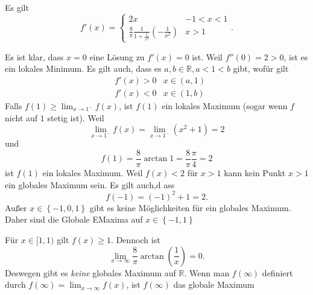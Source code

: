 \documentclass[prb,12pt]{revtex4-2}
\theoremstyle{definition}
\theoremstyle{definition}
\newcommand{\R}{\mathbb{R}}
\begin{document}
Es gilt
\[
f'(x)=\begin{cases}
	2x & -1< x < 1 \\
	\frac{8}{\pi}\frac{1}{1+\frac{1}{x^2}}\left( -\frac{1}{x^2} \right) & x>1
\end{cases}
.\] 

Es ist klar, dass $x=0$ eine L\"{o}sung zu $f'(x)=0$ ist. Weil $f''(0)=2>0$, ist es ein lokales Minimum. Es gilt auch, dass es $a,b\in \R, a<1<b$ gibt, wof\"{u}r gilt
\begin{align*}
	& f'(x)>0 & x\in (a,1)\\
	& f'(x)<0 & x\in (1,b)
\end{align*}
Falls $f(1)\ge \lim_{x \to 1^{-}} f(x)$, ist $f(1)$ ein lokales Maximum (sogar wenn $f$ nicht auf $1$ stetig ist). Weil
\[
	\lim_{x \to 1^{-}} f(x)=\lim_{x \to 1^{-}} \left( x^2+1 \right) =2\] 
	und
	\[
	f(1)=\frac{8}{\pi}\arctan 1=\frac{8}{\pi}\frac{\pi}{4}=2\] 
	ist $f(1)$ ein lokales Maximum. Weil $f(x)<2$ f\"{u}r $x>1$ kann kein Punkt $x>1$ ein globales Maximum sein. Es gilt auch,d ass
	\[
	f(-1)=(-1)^2+1=2
	.\] 
	Außer $x\in \left\{ -1,0,1 \right\} $ gibt es keine M\"{o}glichkeiten f\"{u}r ein globales Maximum. Daher sind die Globale EMaxima auf $x\in \left\{ -1,1 \right\} $ 

	F\"{u}r $x\in [1,1)$ gilt $f(x)\ge 1$. Dennoch ist
	\[
	\lim_{x \to \infty} \frac{8}{\pi}\arctan\left( \frac{1}{x} \right) =0
	.\] 
	Deswegen gibt es \emph{keine} globales Maximum auf $\R$. Wenn man $f(\infty)$ definiert durch $f(\infty)=\lim_{x \to \infty} f(x)$, ist $f(\infty)$ das globale Maximum
\end{document}
